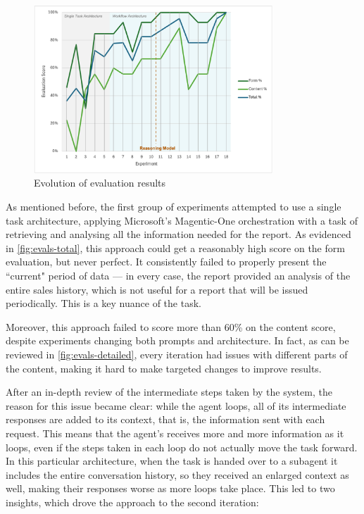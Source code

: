 \documentclass[a4paper]{report}
\begin{document}
\begin{figure}[H]
\centering
\includegraphics[width=0.8\textwidth]{images/evals-combined.png}
\caption{Evolution of evaluation results}
\label{fig:evals-total}
\end{figure}

As mentioned before, the first group of experiments attempted to use a single task architecture, applying Microsoft's Magentic-One orchestration with a task of retrieving and analysing all the information needed for the report. As evidenced in \autoref{fig:evals-total}, this approach could get a reasonably high score on the form evaluation, but never perfect. It consistently failed to properly present the ``current" period of data --- in every case, the report provided an analysis of the entire sales history, which is not useful for a report that will be issued periodically. This is a key nuance of the task.

Moreover, this approach failed to score more than 60\% on the content score, despite experiments changing both prompts and architecture. In fact, as can be reviewed in \autoref{fig:evals-detailed}, every iteration had issues with different parts of the content, making it hard to make targeted changes to improve results.

After an in-depth review of the intermediate steps taken by the system, the reason for this issue became clear: while the agent loops, all of its intermediate responses are added to its context, that is, the information sent with each request. This means that the agent's receives more and more information as it loops, even if the steps taken in each loop do not actually move the task forward. In this particular architecture, when the task is handed over to a subagent it includes the entire conversation history, so they received an enlarged context as well, making their responses worse as more loops take place. This led to two insights, which drove the approach to the second iteration:
\end{document}
